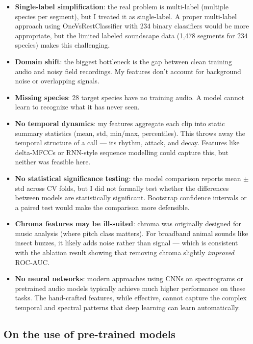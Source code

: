 \documentclass[11pt,a4paper]{article}
\begin{document}
\begin{itemize}
    \item \textbf{Single-label simplification}: the real problem is multi-label (multiple species per segment), but I treated it as single-label. A proper multi-label approach using OneVsRestClassifier with 234 binary classifiers would be more appropriate, but the limited labeled soundscape data (1,478 segments for 234 species) makes this challenging.
    \item \textbf{Domain shift}: the biggest bottleneck is the gap between clean training audio and noisy field recordings. My features don't account for background noise or overlapping signals.
    \item \textbf{Missing species}: 28 target species have no training audio. A model cannot learn to recognize what it has never seen.
    \item \textbf{No temporal dynamics}: my features aggregate each clip into static summary statistics (mean, std, min/max, percentiles). This throws away the temporal structure of a call — its rhythm, attack, and decay. Features like delta-MFCCs or RNN-style sequence modelling could capture this, but neither was feasible here.
    \item \textbf{No statistical significance testing}: the model comparison reports mean $\pm$ std across CV folds, but I did not formally test whether the differences between models are statistically significant. Bootstrap confidence intervals or a paired test would make the comparison more defensible.
    \item \textbf{Chroma features may be ill-suited}: chroma was originally designed for music analysis (where pitch class matters). For broadband animal sounds like insect buzzes, it likely adds noise rather than signal — which is consistent with the ablation result showing that removing chroma slightly \textit{improved} ROC-AUC.
    \item \textbf{No neural networks}: modern approaches using CNNs on spectrograms or pretrained audio models typically achieve much higher performance on these tasks. The hand-crafted features, while effective, cannot capture the complex temporal and spectral patterns that deep learning can learn automatically.
\end{itemize}

\subsection{On the use of pre-trained models}
\end{document}
